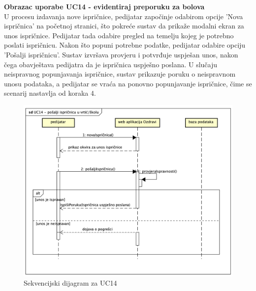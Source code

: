 				\noindent\textbf{Obrazac uporabe UC14 - evidentiraj preporuku za bolova}\\
				U procesu izdavanja nove ispričnice, pedijatar započinje odabirom opcije 'Nova ispričnica' 
				na početnoj stranici, što pokreće sustav da prikaže modalni ekran za unos ispričnice. 
				Pedijatar tada odabire pregled na temelju kojeg je potrebno poslati ispričnicu. Nakon 
				što popuni potrebne podatke, pedijatar odabire opciju 'Pošalji ispričnicu'. Sustav 
				izvršava provjeru i potvrđuje uspješan unos, nakon čega obavještava pedijatra da je 
				ispričnica uspješno poslana. U slučaju neispravnog popunjavanja ispričnice, sustav 
				prikazuje poruku o neispravnom unosu podataka, a pedijatar se vraća na ponovno 
				popunjavanje ispričnice, čime se scenarij nastavlja od koraka 4. \\

				\begin{figure}[H]
						\includegraphics[width=\textwidth]{slike/sduc14.png} 
						\caption{Sekvencijski dijagram za UC14}
						\label{fig:promjene2} 
				\end{figure}

				\eject


	
